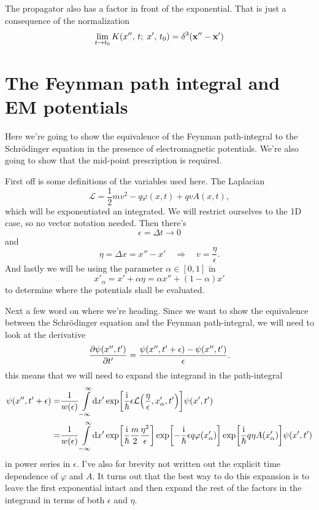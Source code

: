 \documentclass[11pt,letter, swedish, english
]{article}
\begin{document}
The propagator also has a factor in front of the exponential. That is
just a consequence of the normalization
\begin{equation}
\lim_{t\to t_0} K(x'',\, t;\; x',\, t_0)
=\delta^3\qty(\vb{x}''-\vb{x}')
\end{equation}


\section{The Feynman path integral and EM potentials}
Here we're going to show the equivalence of the Feynman path-integral
to the Schrödinger equation in the presence of electromagnetic
potentials. We're also going to show that the mid-point prescription is
required. 

First off is some definitions of the variables used here.
The Laplacian
\begin{equation}
\mathcal{L}=\frac{1}{2}m v^2 - q\varphi(x, t) + qvA(x, t),
\end{equation}
which will be exponentiated an integrated. We will restrict ourselves
to the 1D case, so no vector notation needed. Then there's
\begin{equation}
\epsilon=\Delta{t}\to0
\end{equation}
and
\begin{equation}
\eta=\Delta{x}=x''-x'
\quad\Longrightarrow\quad
v=\frac{\eta}{\epsilon}.
\end{equation}
And lastly we will be using the parameter $\alpha\in[0, 1]$ in
\begin{equation}
x'_\alpha=x'+\alpha\eta=\alpha x'' + (1-\alpha)x'
\end{equation}
to determine where the potentials shall be evaluated.

Next a few word on where we're heading. Since we want to show the
equivalence between the Schrödinger equation and the Feynman
path-integral, we will need to look at the derivative
\begin{equation}
\pdv{\psi(x'', t')}{t'} = \frac{\psi(x'', t'+\epsilon)-\psi(x'', t')}{\epsilon}.
\end{equation}
this means that we will need to expand the integrand in the path-integral
\begin{equation}
\begin{aligned}
\psi(x'', t'+\epsilon)=&\frac{1}{w(\epsilon)}\int_{-\infty}^{\infty}\!\rd{x'}
\exp[\frac{\ii}{\hbar}\epsilon
\mathcal{L}\qty(\frac{\eta}{\epsilon}, x'_\alpha, t')]\psi(x', t')\\
=&\frac{1}{w(\epsilon)}\int_{-\infty}^{\infty}\!\rd{x'}
\exp[\frac{\ii}{\hbar}\frac{m}{2}\frac{\eta^2}{\epsilon}]
\exp[-\frac{\ii}{\hbar}\epsilon q\varphi(x'_\alpha)]
\exp[\frac{\ii}{\hbar} q\eta A(x'_\alpha)]
\psi(x', t')
\end{aligned}
\end{equation}
in power series in $\epsilon$. I've also for brevity not written out
the explicit time dependence of $\varphi$ and $A$. It turns out that
the best way to do this expansion is to leave the first exponential
intact and then expand the rest of the factors in the integrand in
terms of both $\epsilon$ and $\eta$.
\end{document}
